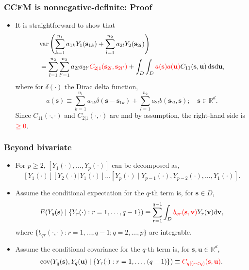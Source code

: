\documentclass{beamer}
\newcommand{\intd} {\mathrm{d}}
\newcommand{\svec} {\textbf{s}}
\newcommand{\uvec} {\textbf{u}}
\newcommand{\s}{\mathbf{s}}
\renewcommand{\v}{\mathbf{v}}
\renewcommand{\u}{\mathbf{u}}
\renewcommand{\d}{\mathrm{d}}
\newcommand{\E}{E}
\newcommand{\cov}{\mathrm{cov}}
\newcommand{\var}{\mathrm{var}}
\newcommand{\RR}{\mathbb{R}}
\newcommand{\red}{\textcolor{red}}%
\begin{document}

\begin{frame}
\frametitle{CCFM is nonnegative-definite: Proof}

\begin{itemize}
\item It is straightforward to show that
\begin{align*}
& \var\left(\sum_{k=1}^{n_1}{a_{1k}Y_1(\s_{1k})}+\sum_{l=1}^{n_2}{a_{2l}Y_2(\s_{2l})}\right)\\
&= \sum_{l=1}^{n_2}\sum_{l'=1}^{n_2}a_{2l}a_{2l'}\textcolor{red}{C_{2\mid 1}(\s_{2l},\s_{2l'})}+\int_D \int_D{\red{a(\s)a(\u)}}C_{11}(\s,\u)\,\d\s\d\u,
\end{align*}
where for $\delta(\cdot)$ the Dirac delta function,
\begin{equation*}
a(\s)\equiv \sum_{k=1}^{n_1}a_{1k}\delta(\s-\s_{1k})+\sum_{l=1}^{n_2}a_{2l}b(\s_{2l},\s);\quad \s\in \RR^d.
\end{equation*}
Since $C_{11}(\cdot,\cdot)$ and $C_{2|1}(\cdot,\cdot)$ are nnd by assumption, the right-hand side is $\textcolor{red}{\geq0}$.
\end{itemize}
\end{frame}


\begin{frame}
\frametitle{Beyond bivariate}

\begin{itemize}
\item For $p\geq2$, $[Y_1(\cdot),\dots,Y_p(\cdot)]$ can be decomposed as,
$$
[Y_1(\cdot)][Y_2(\cdot)|Y_1(\cdot)]\ldots[Y_p(\cdot) \mid  Y_{p-1}(\cdot),Y_{p-2}(\cdot),\dots,Y_1(\cdot)].
$$ \pause
\vspace{-.6cm}
\item Assume the conditional expectation for the $q$-th term is, for $\s\in D$,
\begin{equation*}
\E(Y_q(\svec) \mid  \{Y_r(\cdot) : r = 1,\dots,q-1\}) \equiv \sum_{r = 1}^{q-1} \int_D \textcolor{red}{b_{qr}(\svec,\v)}Y_r(\v) \intd \v,
\end{equation*}
where $\{b_{qr}(\cdot,\cdot):r=1,\ldots,q-1;q=2,\ldots,p\}$ are integrable. \pause
\item Assume the conditional covariance for the $q$-th term is, for $\s,\u\in\mathbb{R}^d$,
\begin{align*}
\cov(Y_q(\svec), Y_q(\uvec) \mid  \{Y_r(\cdot) : r = 1,\dots,(q-1)\}) \equiv \textcolor{red}{C_{q \mid  (r < q)}(\svec,\uvec)}.
\end{align*}
\end{itemize}
\end{frame}
\end{document}
